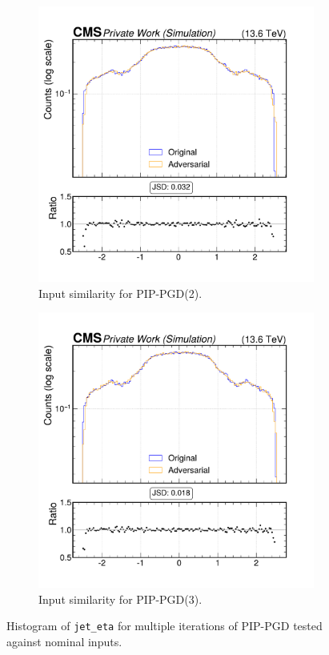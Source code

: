 \begin{figure}[htbp]
\begin{subfigure}[t]{0.32\textwidth}
    \includegraphics[width=\linewidth]{media/output/features/compare/combined_it_2/cmp_global_features_jet_eta.pdf}
    \caption*{Input similarity for PIP-PGD(2).}
  \end{subfigure}\hfill
  \begin{subfigure}[t]{0.32\textwidth}
    \includegraphics[width=\linewidth]{media/output/features/compare/combined_it_3/cmp_global_features_jet_eta.pdf}
    \caption*{Input similarity for PIP-PGD(3).}
  \end{subfigure}

  \caption*{Histogram of \texttt{jet\_eta} for multiple iterations of PIP-PGD tested against nominal inputs.}
  \label{fig:combined_input_jet_eta}
\end{figure}

